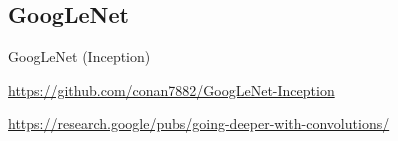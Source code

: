 
\subsection{GoogLeNet}
GoogLeNet (Inception)

\url{https://github.com/conan7882/GoogLeNet-Inception}

\url{https://research.google/pubs/going-deeper-with-convolutions/}